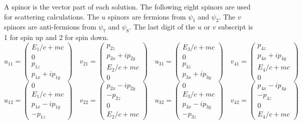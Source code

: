 \documentclass[12pt]{article}
\begin{document}
\noindent
A spinor is the vector part of each solution.
The following eight spinors are used for scattering calculations.
The $u$ spinors are fermions from $\psi_1$ and $\psi_2$.
The $v$ spinors are anti-fermions from $\psi_7$ and $\psi_8$.
The last digit of the $u$ or $v$ subscript is 1 for spin up and 2 for spin down.
\begin{equation*}
u_{11}=\begin{pmatrix}E_1/c+mc\\0\\p_{1z}\\p_{1x}+ip_{1y}\end{pmatrix}\quad
v_{21}=\begin{pmatrix}p_{2z}\\p_{2x}+ip_{2y}\\E_2/c+mc\\0\end{pmatrix}\quad
u_{31}=\begin{pmatrix}E_3/c+mc\\0\\p_{3z}\\p_{3x}+ip_{3y}\end{pmatrix}\quad
v_{41}=\begin{pmatrix}p_{4z}\\p_{4x}+ip_{4y}\\E_4/c+mc\\0\end{pmatrix}
\end{equation*}
\begin{equation*}
u_{12}=\begin{pmatrix}0\\E_1/c+mc\\p_{1x}-ip_{1y}\\-p_{1z}\end{pmatrix}\quad
v_{22}=\begin{pmatrix}p_{2x}-ip_{2y}\\-p_{2z}\\0\\E_2/c+mc\end{pmatrix}\quad
u_{32}=\begin{pmatrix}0\\E_3/c+mc\\p_{3x}-ip_{3y}\\-p_{3z}\end{pmatrix}\quad
v_{42}=\begin{pmatrix}p_{4x}-ip_{4y}\\-p_{4z}\\0\\E_4/c+mc\end{pmatrix}
\end{equation*}
\end{document}
